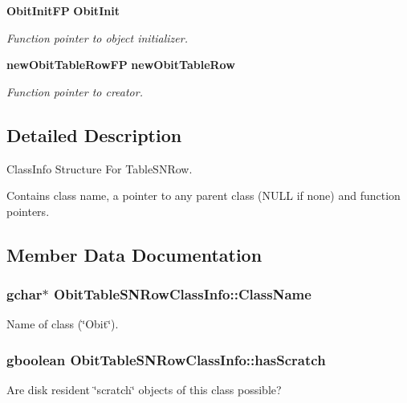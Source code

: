 \begin{CompactItemize}
{\bf Obit\-Init\-FP} {\bf Obit\-Init}
\begin{CompactList}\small\item\em Function pointer to object initializer. \item\end{CompactList}\item 
{\bf new\-Obit\-Table\-Row\-FP} {\bf new\-Obit\-Table\-Row}
\begin{CompactList}\small\item\em Function pointer to creator. \item\end{CompactList}\end{CompactItemize}


\subsection{Detailed Description}
Class\-Info Structure For Table\-SNRow. 

Contains class name, a pointer to any parent class (NULL if none) and function pointers. 



\subsection{Member Data Documentation}
\subsubsection{\setlength{\rightskip}{0pt plus 5cm}gchar$\ast$ {\bf Obit\-Table\-SNRow\-Class\-Info::Class\-Name}}\label{structObitTableSNRowClassInfo_o2}


Name of class (\char`\"{}Obit\char`\"{}). 

\subsubsection{\setlength{\rightskip}{0pt plus 5cm}gboolean {\bf Obit\-Table\-SNRow\-Class\-Info::has\-Scratch}}\label{structObitTableSNRowClassInfo_o1}


Are disk resident \char`\"{}scratch\char`\"{} objects of this class possible? 

